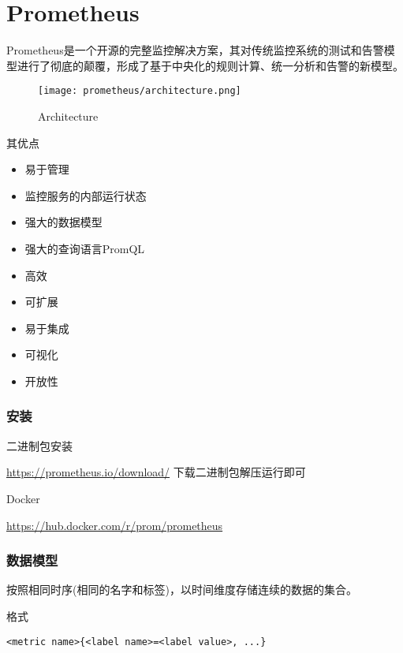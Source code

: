 \chapter{Prometheus}


Prometheus是一个开源的完整监控解决方案，其对传统监控系统的测试和告警模型进行了彻底的颠覆，形成了基于中央化的规则计算、统一分析和告警的新模型。

\begin{figure}[H]
    \centering
    \texttt{[image: prometheus/architecture.png]}
    \caption{Architecture}
\end{figure}


其优点

\begin{itemize}
    \item 易于管理
    \item 监控服务的内部运行状态
    \item 强大的数据模型
    \item 强大的查询语言PromQL
    \item 高效
    \item 可扩展
    \item 易于集成
    \item 可视化
    \item 开放性
\end{itemize}

\subsection{安装}

二进制包安装


\href{https://prometheus.io/download/}{https://prometheus.io/download/} 下载二进制包解压运行即可

Docker

\href{https://hub.docker.com/r/prom/prometheus}{https://hub.docker.com/r/prom/prometheus}


\subsection{数据模型}

按照相同时序(相同的名字和标签)，以时间维度存储连续的数据的集合。


格式

\begin{lstlisting}[language=shell]
<metric name>{<label name>=<label value>, ...}
\end{lstlisting}

